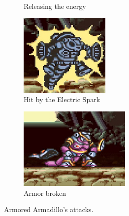 \begin{figure}[htp]
\begin{subfigure}{0.45\textwidth}
		\caption{Releasing the energy}
	\end{subfigure}
	\begin{subfigure}{0.45\textwidth}
		\centering
		\includegraphics[height=4cm]{figures/X1/Armored_armadillo/Armadillo_shock_1.jpg}
		\caption{Hit by the Electric Spark}
	\end{subfigure}
	\begin{subfigure}{0.45\textwidth}
		\centering
		\includegraphics[height=4cm]{figures/X1/Armored_armadillo/Armadillo_shock_2.jpg}
		\caption{Armor broken}
	\end{subfigure}
	\caption{Armored Armadillo's attacks.}
\end{figure}

